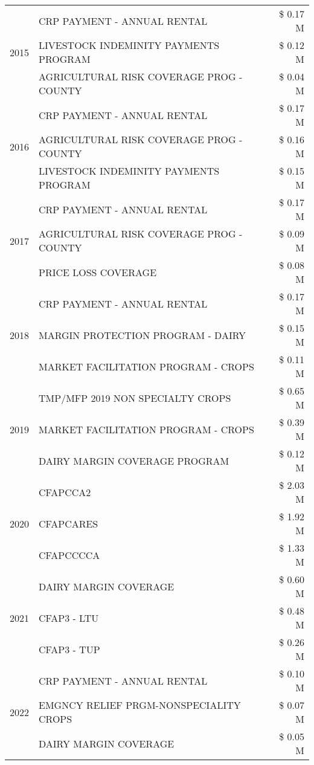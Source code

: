 \begin{tabular}{llr}
\cline{1-3}
\multirow[t]{3}{*}{2015} & CRP PAYMENT - ANNUAL RENTAL & \$ 0.17 M \\
 & LIVESTOCK INDEMINITY PAYMENTS PROGRAM & \$ 0.12 M \\
 & AGRICULTURAL RISK COVERAGE PROG - COUNTY & \$ 0.04 M \\
\cline{1-3}
\multirow[t]{3}{*}{2016} & CRP PAYMENT - ANNUAL RENTAL & \$ 0.17 M \\
 & AGRICULTURAL RISK COVERAGE PROG - COUNTY & \$ 0.16 M \\
 & LIVESTOCK INDEMINITY PAYMENTS PROGRAM & \$ 0.15 M \\
\cline{1-3}
\multirow[t]{3}{*}{2017} & CRP PAYMENT - ANNUAL RENTAL & \$ 0.17 M \\
 & AGRICULTURAL RISK COVERAGE PROG - COUNTY & \$ 0.09 M \\
 & PRICE LOSS COVERAGE & \$ 0.08 M \\
\cline{1-3}
\multirow[t]{3}{*}{2018} & CRP PAYMENT - ANNUAL RENTAL & \$ 0.17 M \\
 & MARGIN PROTECTION PROGRAM - DAIRY & \$ 0.15 M \\
 & MARKET FACILITATION PROGRAM - CROPS & \$ 0.11 M \\
\cline{1-3}
\multirow[t]{3}{*}{2019} & TMP/MFP 2019 NON SPECIALTY CROPS & \$ 0.65 M \\
 & MARKET FACILITATION PROGRAM - CROPS & \$ 0.39 M \\
 & DAIRY MARGIN COVERAGE PROGRAM & \$ 0.12 M \\
\cline{1-3}
\multirow[t]{3}{*}{2020} & CFAPCCA2 & \$ 2.03 M \\
 & CFAPCARES & \$ 1.92 M \\
 & CFAPCCCCA & \$ 1.33 M \\
\cline{1-3}
\multirow[t]{3}{*}{2021} & DAIRY MARGIN COVERAGE & \$ 0.60 M \\
 & CFAP3 - LTU & \$ 0.48 M \\
 & CFAP3 - TUP & \$ 0.26 M \\
\cline{1-3}
\multirow[t]{3}{*}{2022} & CRP PAYMENT - ANNUAL RENTAL & \$ 0.10 M \\
 & EMGNCY RELIEF PRGM-NONSPECIALITY CROPS & \$ 0.07 M \\
 & DAIRY MARGIN COVERAGE & \$ 0.05 M \\
\cline{1-3}
\bottomrule
\end{tabular}
